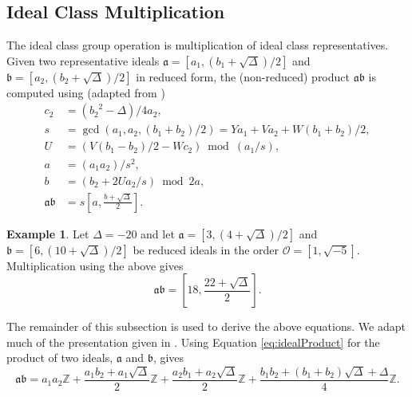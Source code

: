 \documentclass{ucalgthes1}
\theoremstyle{definition}
\newtheorem{example}[thm]{Example}
\newcommand{\ZZ}{\mathbb{Z}}
\newcommand{\OO}{\mathcal{O}}
\newcommand{\ideal}{\mathfrak}
\begin{document}
\subsection{Ideal Class Multiplication}
\label{subsec:idealMultiply}

The ideal class group operation is multiplication of ideal class representatives. Given two representative ideals $\mathfrak a = [a_1, (b_1 + \sqrt{\Delta})/2]$ and $\mathfrak b = [a_2, (b_2 + \sqrt{\Delta})/2]$ in reduced form, the (non-reduced) product $\mathfrak a \mathfrak b$ is computed using (adapted from \cite[\S 5.4]{Jacobson2009})
\begin{align}
	c_2 & = ({b_2}^2-\Delta)/4a_2, \nonumber \\
	s & = \gcd(a_1, a_2, (b_1+b_2)/2) = Ya_1 + Va_2 + W(b_1+b_2)/2,    \label{eq:idealProductS} \\
	U & = (V(b_1-b_2)/2 - Wc_2) \bmod{(a_1/s)},                        \label{eq:idealProductU} \\
	a & = (a_1a_2)/s^2,                                                \label{eq:idealProductA} \\
	b & = (b_2 + 2Ua_2/s) \bmod{2a},                                   \label{eq:idealProductB} \\
	\mathfrak a \mathfrak b & = s\left[a, \frac{b + \sqrt{\Delta}}{2}\right]. \nonumber
\end{align}

\begin{example}
Let $\Delta = -20$ and let $\ideal a = [3, (4+\sqrt{\Delta})/2]$ and $\ideal b = [6, (10 + \sqrt{\Delta})/2]$ be reduced ideals in the order $\OO = [1,\sqrt{-5}]$.  Multiplication using the above gives
\[
	\ideal a \ideal b = \left[18, \frac{22 + \sqrt{\Delta}}{2}\right].
\]
\end{example}

The remainder of this subsection is used to derive the above equations.  We adapt much of the presentation given in \cite[pp.117--118]{Jacobson2009}. Using Equation \eqref{eq:idealProduct} for the product of two ideals, $\ideal a$ and $\ideal b$, gives
\begin{equation}
\label{eq:productExpanded}
\mathfrak{a} \mathfrak{b} =
a_1 a_2 \ZZ + \frac{a_1b_2 + a_1\sqrt{\Delta}}{2} \ZZ + \frac{a_2b_1 + a_2\sqrt{\Delta}}{2} \ZZ + \frac{b_1b_2 + (b_1+b_2)\sqrt{\Delta} + \Delta}{4} \ZZ.
\end{equation}
\end{document}
